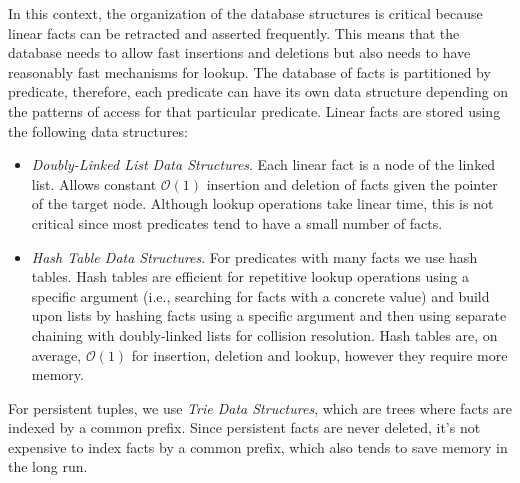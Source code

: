 In this context, the organization of the database structures is critical because
linear facts can be retracted and asserted frequently. This means that the
database needs to allow fast insertions and deletions but also needs to have
reasonably fast mechanisms for lookup. The database of facts is partitioned by
predicate, therefore, each predicate can have its own data structure depending
on the patterns of access for that particular predicate. Linear facts are stored
using the following data structures:


\begin{itemize}

\item \emph{Doubly-Linked List Data Structures}. Each linear fact is a node of
   the linked list. Allows constant $\mathcal{O}(1)$ insertion and deletion of
   facts given the pointer of the target node. Although lookup operations take
   linear time, this is not critical since most predicates tend to have a small
   number of facts.

\item \emph{Hash Table Data Structures}. For predicates with many facts we use
   hash tables. Hash tables are efficient for repetitive lookup operations
   using a specific argument (i.e., searching for facts with a concrete value)
   and build upon lists by hashing facts using a specific argument and then
   using separate chaining with doubly-linked lists for collision resolution.
   Hash tables are, on average, $\mathcal{O}(1)$ for insertion, deletion and
   lookup, however they require more memory.

\end{itemize}

For persistent tuples, we use \emph{Trie Data Structures}, which are trees where
facts are indexed by a common prefix. Since persistent facts are never deleted,
it's not expensive to index facts by a common prefix, which also tends to save
memory in the long run.

